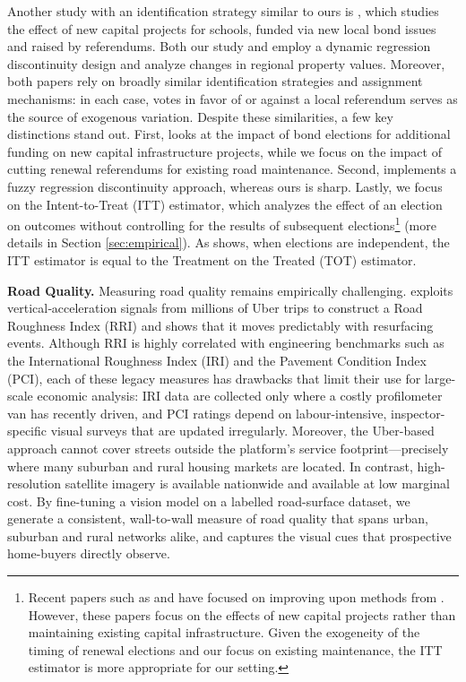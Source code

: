 Another study with an identification strategy similar to ours is \cite{cellini2010value}, which studies the effect of new capital projects for schools, funded via new local bond issues and raised by referendums. Both our study and \cite{cellini2010value} employ a dynamic regression discontinuity design and analyze changes in regional property values. Moreover, both papers rely on broadly similar identification strategies and assignment mechanisms: in each case, votes in favor of or against a local referendum serves as the source of exogenous variation. Despite these similarities, a few key distinctions stand out. First, \cite{cellini2010value} looks at the impact of bond elections for additional funding on new capital infrastructure projects, while we focus on the impact of cutting renewal referendums for existing road maintenance. Second, \cite{cellini2010value} implements a fuzzy regression discontinuity approach, whereas ours is sharp. Lastly, we focus on the Intent-to-Treat (ITT) estimator, which analyzes the effect of an election on outcomes without controlling for the results of subsequent elections\footnote{Recent papers such as \cite{hsu2024dynamic} and \cite{biasi_what_2025} have focused on improving upon methods from \cite{cellini2010value}. However, these papers focus on the effects of new capital projects rather than maintaining existing capital infrastructure. Given the exogeneity of the timing of renewal elections and our focus on existing maintenance, the ITT estimator is more appropriate for our setting.} (more details in Section \ref{sec:empirical}). As \cite{cellini2010value} shows, when elections are independent, the ITT estimator is equal to the Treatment on the Treated (TOT) estimator. 



{\bf Road Quality.} Measuring road quality remains empirically challenging. \cite{currier2023} exploits vertical‐acceleration signals from millions of Uber trips to construct a Road Roughness Index (RRI) and shows that it moves predictably with resurfacing events. Although RRI is highly correlated with engineering benchmarks such as the International Roughness Index (IRI) and the Pavement Condition Index (PCI), each of these legacy measures has drawbacks that limit their use for large-scale economic analysis: IRI data are collected only where a costly profilometer van has recently driven, and PCI ratings depend on labour-intensive, inspector-specific visual surveys that are updated irregularly. Moreover, the Uber-based approach cannot cover streets outside the platform’s service footprint—precisely where many suburban and rural housing markets are located. In contrast, high-resolution satellite imagery is available nationwide and available at low marginal cost. By fine-tuning a vision model on a labelled road-surface dataset, we generate a consistent, wall-to-wall measure of road quality that spans urban, suburban and rural networks alike, and captures the visual cues that prospective home-buyers directly observe. 


